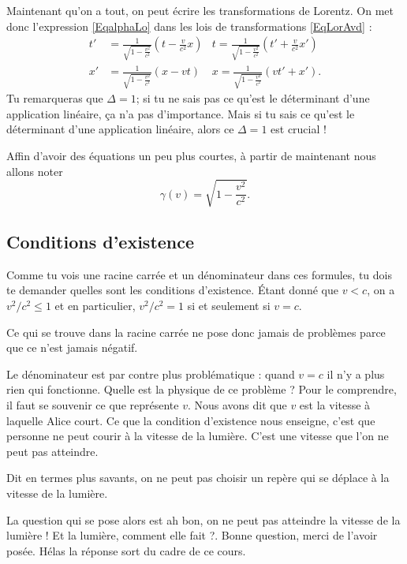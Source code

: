 Maintenant qu'on a tout, on peut écrire les transformations de Lorentz. On met donc l'expression \eqref{EqalphaLo} dans les lois de transformations \eqref{EqLorAvd} :
\begin{equation}
\begin{aligned}		\label{EqTrLorentz}
  t'&= \frac{1}{ \sqrt{1-\frac{ v^2 }{ c^2 }} }\left( t-\frac{ v }{ c^2 }x \right)	& t=	\frac{1}{ \sqrt{1-\frac{ v^2 }{ c^2 }} }\left(t'+\frac{ v }{ c^2 }x'\right)\\
x'&=\frac{1}{ \sqrt{1-\frac{ v^2 }{ c^2 }} }(x-vt)	&x=\frac{1}{ \sqrt{1-\frac{ v^2 }{ c^2 }} }(vt'+x').
\end{aligned}
\end{equation}
Tu remarqueras que $\Delta=1$; si tu ne sais pas ce qu'est le déterminant d'une application linéaire, ça n'a pas d'importance. Mais si tu sais ce qu'est le déterminant d'une application linéaire, alors ce $\Delta=1$ est crucial !

Affin d'avoir des équations un peu plus courtes, à partir de maintenant nous allons noter
\[ 
  \gamma(v)=\sqrt{1-\frac{ v^2 }{ c^2 }}.
\]


\subsection{Conditions d'existence}

Comme tu vois une racine carrée et un dénominateur dans ces formules, tu dois te demander quelles sont les conditions d'existence. Étant donné que $v<c$, on a $v^2/c^2\leq 1$ et en particulier, $v^2/c^2=1$ si et seulement si $v=c$. 

Ce qui se trouve dans la racine carrée ne pose donc jamais de problèmes parce que ce n'est jamais négatif. 

Le dénominateur est par contre plus problématique : quand $v=c$ il n'y a plus rien qui fonctionne. Quelle est la physique de ce problème ? Pour le comprendre, il faut se souvenir ce que représente $v$. Nous avons dit que $v$ est la vitesse à laquelle Alice court. Ce que la condition d'existence nous enseigne, c'est que personne ne peut courir à la vitesse de la lumière. C'est une vitesse que l'on ne peut pas atteindre. 

Dit en termes plus savants, on ne peut pas choisir un repère qui se déplace à la vitesse de la lumière.

La question qui se pose alors est \og ah bon, on ne peut pas atteindre la vitesse de la lumière ! Et la lumière, comment elle fait ?\fg. Bonne question, merci de l'avoir posée. Hélas la réponse sort du cadre de ce cours.

